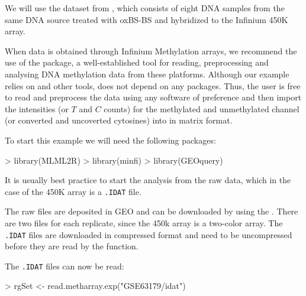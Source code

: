 \documentclass{article}
\begin{document}
We will use the dataset from \cite{10.1371/journal.pone.0118202}, which consists of eight DNA samples from the same DNA source treated with oxBS-BS and hybridized to the Infinium 450K array.

When data is obtained through Infinium Methylation arrays, we recommend the use of the  package, a well-established tool for reading, preprocessing and analysing DNA methylation data from these platforms. Although our example relies on  and other \Bioconductor{} tools,  does not depend on any packages. Thus, the user is free to read and preprocess the data using any software of preference and then import the intensities (or $T$ and $C$ counts) for the methylated and unmethylated channel (or converted and uncoverted cytosines) into \R{} in matrix format.

To start this example we will need the following packages:
\begin{Schunk}
\begin{Sinput}
> library(MLML2R)
> library(minfi)
> library(GEOquery)
\end{Sinput}
\end{Schunk}


It is usually best practice to start the analysis from the raw data, which in the case of the 450K array is a \verb|.IDAT| file.

The raw files are deposited in GEO and can be downloaded by using the . There are two files for each replicate, since the 450k array is a two-color array. The \verb|.IDAT| files are downloaded in compressed format and need to be uncompressed before they are read by the  function.

\begin{Schunk}
\end{Schunk}

The \verb|.IDAT| files can now be read:
\begin{Schunk}
\begin{Sinput}
> rgSet <- read.metharray.exp("GSE63179/idat")
\end{Sinput}
\end{Schunk}
\end{document}
